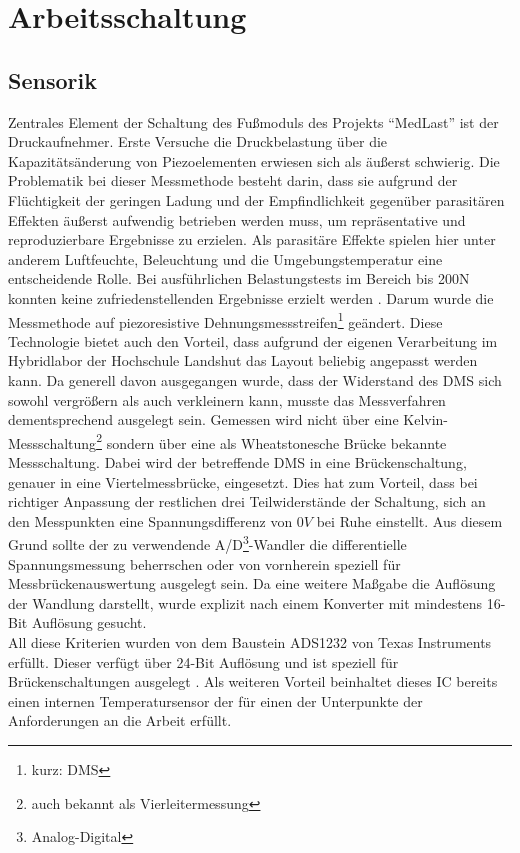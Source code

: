 \documentclass[12pt]{scrreprt} %
\begin{document}
\section{Arbeitsschaltung}
\subsection{Sensorik}
Zentrales Element der Schaltung des Fußmoduls des Projekts "`MedLast"' ist der Druckaufnehmer. Erste Versuche die Druckbelastung über die Kapazitätsänderung von Piezoelementen erwiesen sich als äußerst schwierig. Die Problematik bei dieser Messmethode besteht darin, dass sie aufgrund der Flüchtigkeit der geringen Ladung und der Empfindlichkeit gegenüber parasitären Effekten äußerst aufwendig betrieben werden muss, um repräsentative und reproduzierbare Ergebnisse zu erzielen. Als parasitäre Effekte spielen hier unter anderem Luftfeuchte, Beleuchtung und die Umgebungstemperatur eine entscheidende Rolle. Bei ausführlichen Belastungstests im Bereich bis 200N konnten keine zufriedenstellenden Ergebnisse erzielt werden \citep{Jobstmann2012}. \newline
Darum wurde die Messmethode auf piezoresistive Dehnungsmessstreifen\footnote{kurz: DMS} geändert. Diese Technologie bietet auch den Vorteil, dass aufgrund der eigenen Verarbeitung im Hybridlabor der Hochschule Landshut das Layout beliebig angepasst werden kann. Da generell davon ausgegangen wurde, dass der Widerstand des DMS sich sowohl vergrößern als auch verkleinern kann, musste das Messverfahren dementsprechend ausgelegt sein. Gemessen wird nicht über eine Kelvin-Messschaltung\footnote{auch bekannt als Vierleitermessung} sondern über eine als Wheatstonesche Brücke bekannte Messschaltung. Dabei wird der betreffende DMS in eine Brückenschaltung, genauer in eine Viertelmessbrücke, eingesetzt. Dies hat zum Vorteil, dass bei richtiger Anpassung der restlichen drei Teilwiderstände der Schaltung, sich an den Messpunkten eine Spannungsdifferenz von $0V$ bei Ruhe einstellt. Aus diesem Grund sollte der zu verwendende A/D\footnote{Analog-Digital}-Wandler die differentielle Spannungsmessung beherrschen oder von vornherein speziell für Messbrückenauswertung ausgelegt sein. Da eine weitere Maßgabe die Auflösung der Wandlung darstellt, wurde explizit nach einem Konverter mit mindestens 16-Bit Auflösung gesucht.\\
All diese Kriterien wurden von dem Baustein ADS1232 von Texas Instruments erfüllt. Dieser verfügt über 24-Bit Auflösung und ist speziell für Brückenschaltungen ausgelegt \citep{ADS1232}. Als weiteren Vorteil beinhaltet dieses IC bereits einen internen Temperatursensor der für einen der Unterpunkte der Anforderungen an die Arbeit erfüllt.


\end{document}

